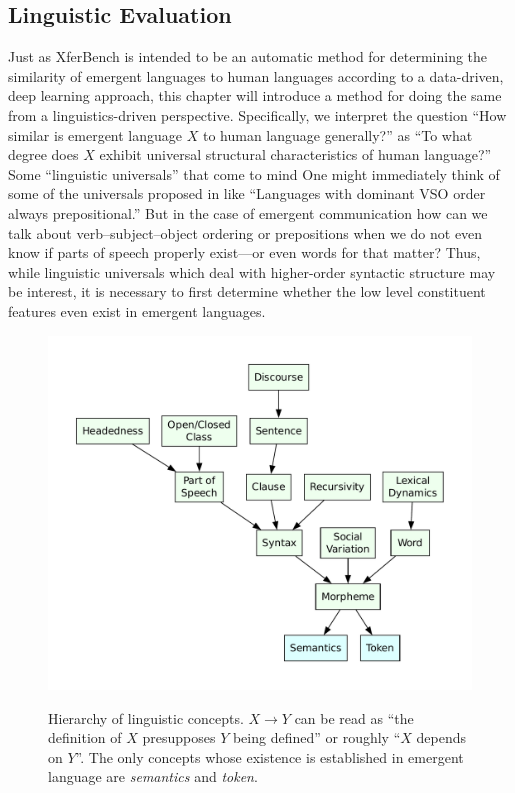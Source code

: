 \subsection{Linguistic Evaluation}

Just as XferBench is intended to be an automatic method for determining the similarity of emergent languages to human languages according to a data-driven, deep learning approach, this chapter will introduce a method for doing the same from a linguistics-driven perspective.
Specifically, we interpret the question ``How similar is emergent language $X$ to human language generally?'' as ``To what degree does $X$ exhibit universal structural characteristics of human language?''
Some ``linguistic universals'' that come to mind 
One might immediately think of some of the universals proposed in \citet{greenberg1963universals} like ``Languages with dominant VSO order always prepositional.''
But in the case of emergent communication how can we talk about verb--subject--object ordering or prepositions when we do not even know if parts of speech properly exist---or even words for that matter?
Thus, while linguistic universals which deal with higher-order syntactic structure may be interest, it is necessary to first determine whether the low level constituent features even exist in emergent languages.



\begin{figure}
  \centering
  \includegraphics[width=0.95\linewidth]{assets/linguistic-dag}
  \caption{%
    Hierarchy of linguistic concepts.
    $X\rightarrow Y$ can be read as ``the definition of $X$ presupposes $Y$ being defined'' or roughly ``$X$ depends on $Y$''.
    The only concepts whose existence is established in emergent language are \emph{semantics} and \emph{token}.}
  \unskip\label{fig:linguistic-dag}
\end{figure}

